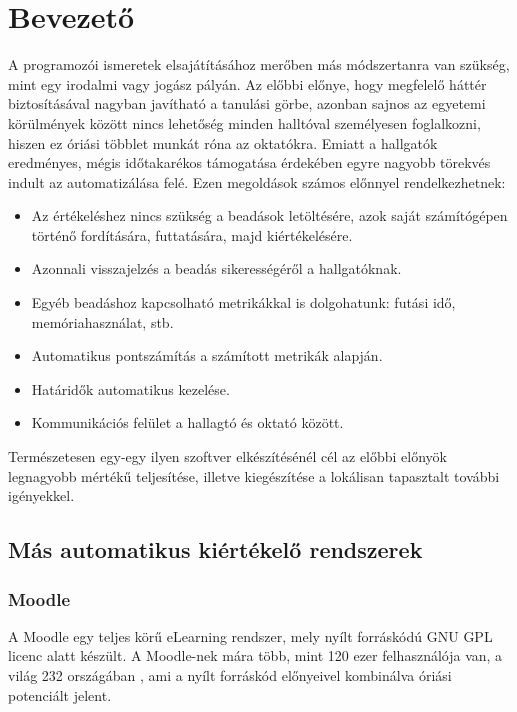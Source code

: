 \chapter*{Bevezető}

A programozói ismeretek elsajátításához merőben más módszertanra van szükség, mint egy irodalmi vagy jogász pályán. Az előbbi előnye, hogy megfelelő háttér biztosításával nagyban javítható a tanulási görbe, azonban sajnos az egyetemi körülmények között nincs lehetőség minden halltóval személyesen foglalkozni, hiszen ez óriási többlet munkát róna az oktatókra. Emiatt a hallgatók eredményes, mégis időtakarékos támogatása érdekében egyre nagyobb törekvés indult az automatizálása felé. Ezen megoldások számos előnnyel rendelkezhetnek:

\begin{itemize}
    \item Az értékeléshez nincs szükség a beadások letöltésére, azok saját számítógépen történő fordítására, futtatására, majd kiértékelésére.
    \item Azonnali visszajelzés a beadás sikerességéről a hallgatóknak.
    \item Egyéb beadáshoz kapcsolható metrikákkal is dolgohatunk: futási idő, memóriahasználat, stb.
    \item Automatikus pontszámítás a számított metrikák alapján.
    \item Határidők automatikus kezelése.
    \item Kommunikációs felület a hallagtó és oktató között.
\end{itemize}

Természetesen egy-egy ilyen szoftver elkészítésénél cél az előbbi előnyök legnagyobb mértékű teljesítése, illetve kiegészítése a lokálisan tapasztalt további igényekkel.

\section*{Más automatikus kiértékelő rendszerek}

\subsection*{Moodle}
A Moodle \cite{Moodle} egy teljes körű eLearning rendszer, mely nyílt forráskódú GNU GPL \cite{GNUGPL} licenc alatt készült. A Moodle-nek mára több, mint 120 ezer felhasználója van, a világ 232 országában \cite{MoodleStats}, ami a nyílt forráskód előnyeivel kombinálva óriási potenciált jelent. 

